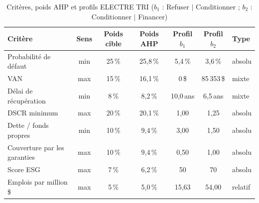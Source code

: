 \begin{table}[htbp]
\centering
\footnotesize\setlength{\tabcolsep}{4pt}
\caption{Critères, poids AHP et profils ELECTRE TRI ($b_1$ : Refuser $|$ Conditionner ; $b_2$ : Conditionner $|$ Financer)}\label{tab:criteres}
\begin{tabular}{lcccccl}
\toprule
Critère & Sens & Poids cible & Poids AHP & Profil $b_1$ & Profil $b_2$ & Type \\
\midrule
Probabilité de défaut & min & 25\,\% & 25,8\,\% & 5,4\,\% & 3,6\,\% & absolu \\
VAN & max & 15\,\% & 16,1\,\% & 0\,\$ & 85\,353\,\$ & mixte \\
Délai de récupération & min & 8\,\% & 8,2\,\% & 10,0\,ans & 6,5\,ans & mixte \\
DSCR minimum & max & 20\,\% & 20,1\,\% & 1,00 & 1,25 & absolu \\
Dette / fonds propres & min & 10\,\% & 9,4\,\% & 3,00 & 1,50 & absolu \\
Couverture par les garanties & max & 10\,\% & 9,4\,\% & 0,50 & 1,00 & absolu \\
Score ESG & max & 7\,\% & 6,2\,\% & 50 & 70 & absolu \\
Emplois par million \$ & max & 5\,\% & 5,0\,\% & 15,63 & 54,00 & relatif \\
\bottomrule
\end{tabular}
\end{table}
